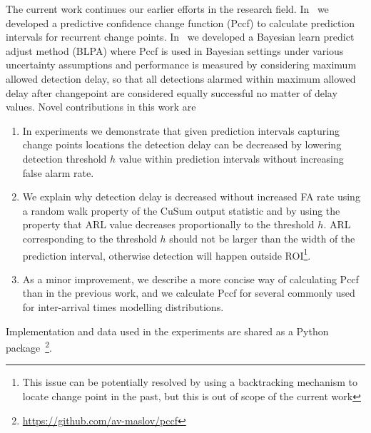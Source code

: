 The current work continues our earlier efforts in the research field.
In~\cite{MaslovSDM2016} we developed a predictive confidence change function (Pccf) to calculate prediction intervals for recurrent change points.
In~\cite{MaslovIJCNN2017} we developed a Bayesian learn predict adjust method (BLPA) where Pccf is used in Bayesian settings under various uncertainty assumptions and performance is measured by considering maximum allowed detection delay, so that all detections alarmed within maximum allowed delay after changepoint are considered equally successful no matter of delay values. 
Novel contributions in this work are
\begin{enumerate}
    \item In experiments we demonstrate that given prediction intervals capturing change points locations the detection delay can be decreased by lowering detection threshold $h$ value within prediction intervals without increasing false alarm rate.  
    
    \item We explain why detection delay is decreased without increased FA rate using a random walk property of the CuSum output statistic and by using the property that ARL value decreases proportionally to the threshold $h$. ARL corresponding to the threshold $h$ should not be larger than the width of the prediction interval, otherwise detection will happen outside ROI\footnote{This issue can be potentially resolved by using a backtracking mechanism to locate change point in the past, but this is out of scope of the current work}.
    
    \item As a minor improvement, we describe a more concise way of calculating Pccf than in the previous work, and we calculate Pccf for several commonly used for inter-arrival times modelling distributions.

\end{enumerate}
Implementation and data used in the experiments are shared as a Python package~\footnote{\href{https://github.com/av-maslov/pccf}{https://github.com/av-maslov/pccf}}.

